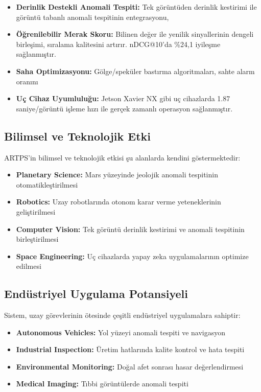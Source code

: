 \documentclass[12pt]{article}
\begin{document}
\begin{itemize}
\item \textbf{Derinlik Destekli Anomali Tespiti:} Tek görüntüden derinlik kestirimi ile görüntü tabanlı anomali tespitinin entegrasyonu, %

\item \textbf{Öğrenilebilir Merak Skoru:} Bilinen değer ile yenilik sinyallerinin dengeli birleşimi, sıralama kalitesini artırır. nDCG@10'da \%24,1 iyileşme sağlanmıştır.

\item \textbf{Saha Optimizasyonu:} Gölge/speküler bastırma algoritmaları, sahte alarm oranını %

\item \textbf{Uç Cihaz Uyumluluğu:} Jetson Xavier NX gibi uç cihazlarda 1.87 saniye/görüntü işleme hızı ile gerçek zamanlı operasyon sağlanmıştır.
\end{itemize}

\subsection{Bilimsel ve Teknolojik Etki}
ARTPS'in bilimsel ve teknolojik etkisi şu alanlarda kendini göstermektedir:

\begin{itemize}
\item \textbf{Planetary Science:} Mars yüzeyinde jeolojik anomali tespitinin otomatikleştirilmesi
\item \textbf{Robotics:} Uzay robotlarında otonom karar verme yeteneklerinin geliştirilmesi
\item \textbf{Computer Vision:} Tek görüntü derinlik kestirimi ve anomali tespitinin birleştirilmesi
\item \textbf{Space Engineering:} Uç cihazlarda yapay zeka uygulamalarının optimize edilmesi
\end{itemize}

\subsection{Endüstriyel Uygulama Potansiyeli}
Sistem, uzay görevlerinin ötesinde çeşitli endüstriyel uygulamalara sahiptir:

\begin{itemize}
\item \textbf{Autonomous Vehicles:} Yol yüzeyi anomali tespiti ve navigasyon
\item \textbf{Industrial Inspection:} Üretim hatlarında kalite kontrol ve hata tespiti
\item \textbf{Environmental Monitoring:} Doğal afet sonrası hasar değerlendirmesi
\item \textbf{Medical Imaging:} Tıbbi görüntülerde anomali tespiti
\end{itemize}
\end{document}

